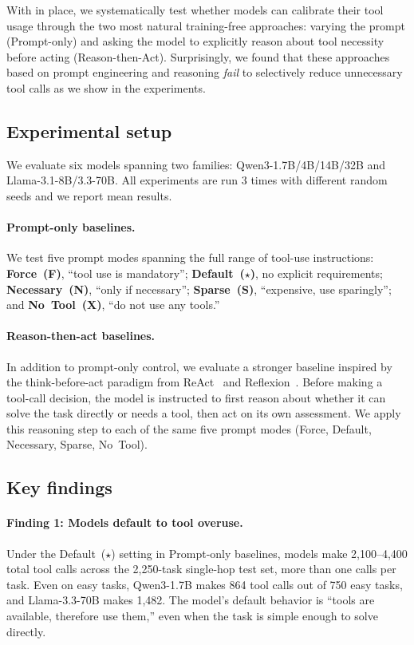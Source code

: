 With \benchmark{} in place, we systematically test whether models can calibrate their tool usage through the two most natural training-free approaches: varying the prompt (Prompt-only) and asking the model to explicitly reason about tool necessity before acting (Reason-then-Act). Surprisingly, we found that these approaches based on prompt engineering and reasoning \textit{fail} to selectively reduce unnecessary tool calls as we show in the experiments. 

\subsection{Experimental setup}

We evaluate six models spanning two families: Qwen3-1.7B/4B/14B/32B and Llama-3.1-8B/3.3-70B. All experiments are run 3 times with different random seeds and we report mean results.

\paragraph{Prompt-only baselines.}
We test five prompt modes spanning the full range of tool-use instructions:
\textbf{Force~(F)}, ``tool use is mandatory'';
\textbf{Default~($\star$)}, no explicit requirements;
\textbf{Necessary~(N)}, ``only if necessary'';
\textbf{Sparse~(S)}, ``expensive, use sparingly'';
and \textbf{No~Tool~(X)}, ``do not use any tools.''

\paragraph{Reason-then-act baselines.}
In addition to prompt-only control, we evaluate a stronger baseline inspired by the think-before-act paradigm from ReAct~\citep{yao2022react} and Reflexion~\citep{shinn2023reflexion}. Before making a tool-call decision, the model is instructed to first reason about whether it can solve the task directly or needs a tool, then act on its own assessment. We apply this reasoning step to each of the same five prompt modes (Force, Default, Necessary, Sparse, No~Tool).

\subsection{Key findings}

\paragraph{Finding 1: Models default to tool overuse.}
Under the Default~($\star$) setting in Prompt-only baselines, models make 2,100--4,400 total tool calls across the 2,250-task single-hop test set, more than one calls per task. Even on easy tasks, Qwen3-1.7B makes 864 tool calls out of 750 easy tasks, and Llama-3.3-70B makes 1,482. The model's default behavior is ``tools are available, therefore use them,'' even when the task is simple enough to solve directly.
\vspace{-5pt}
